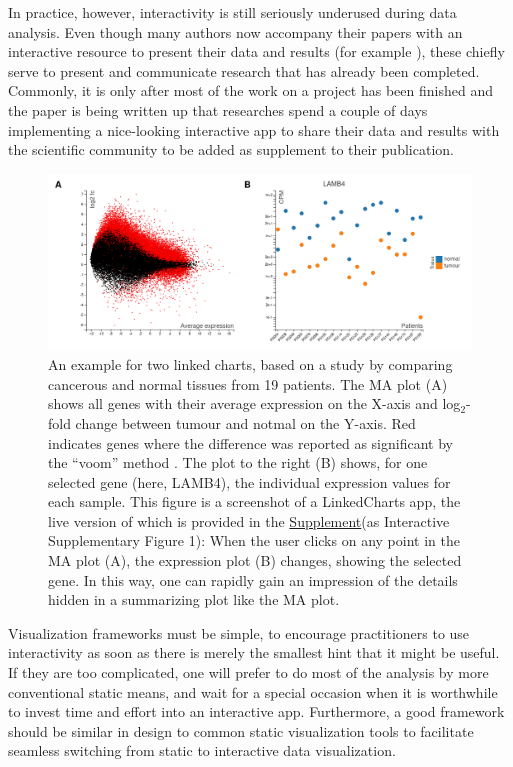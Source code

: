 \documentclass[twocolumn,10pt]{article}
\newcommand{\Supplement}{\href{https://anders-biostat.github.io/lc-paper/}{Supplement}}
\begin{document}
In practice, however, interactivity is still seriously underused during data analysis. Even though many authors now accompany their papers with an interactive resource to present their data and results (for example \citet{travaglini_2020, roider_2020, kalucka_2020}), these chiefly serve to present and communicate research that has already been completed. Commonly, it is only after most of the work on a project has been finished and the paper is being written up that researches spend a couple of days implementing a nice-looking interactive app to share their data and results with the scientific community \citep{batch_2017} to be added as supplement to their publication. 

\begin{figure}[b]
	\includegraphics[width=\textwidth]{FigD/figD.png}
	\caption{An example for two linked charts, based on a study by \citet{conway_2015} comparing cancerous and normal tissues from 19 patients. The MA plot (A) shows all genes with their average expression on the X-axis and log$_2$-fold change between tumour and notmal on the Y-axis. Red indicates genes where the difference was reported as significant by the ``voom'' method \citep{law_2014}. The plot to the right (B) shows, for one selected gene (here, LAMB4), the individual expression values for each sample. This figure is a screenshot of a LinkedCharts app, the live version of which is provided in the \Supplement (as Interactive Supplementary Figure 1): When the user clicks on any point in the MA plot (A), the expression plot (B) changes, showing the selected gene. In this way, one can rapidly gain an impression of the details hidden in a summarizing plot like the
	MA plot.}  
	\label{FigD}
\end{figure}

Visualization frameworks must be simple, to encourage practitioners to use interactivity as soon as there is merely the smallest hint that it might be useful. If they are too complicated, one will prefer to do most of the analysis by more conventional static means, and wait for a special occasion when it is worthwhile to invest time and effort into an interactive app. Furthermore, a good framework should be similar in design to common static visualization tools to facilitate seamless switching from static to interactive data visualization.
\end{document}
